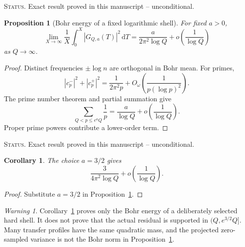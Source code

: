 \documentclass[11pt]{amsart}
\numberwithin{equation}{section}
\theoremstyle{plain}
\newtheorem{proposition}[theorem]{Proposition}
\newtheorem{corollary}[theorem]{Corollary}
\theoremstyle{definition}
\theoremstyle{remark}
\newtheorem{warning}[theorem]{Warning}
\newcommand{\1}{\mathbf{1}}
\newcommand{\dd}{\,\mathrm{d}}
\newcommand{\statusnote}[1]{%
  \par\smallskip\noindent
  \begingroup\footnotesize\textsc{Status.} #1\endgroup
  \par\smallskip}
\begin{document}
\statusnote{Exact result proved in this manuscript -- unconditional.}
\begin{proposition}[Bohr energy of a fixed logarithmic shell]
\label{prop:shell_energy}
For fixed \(a>0\),
\begin{equation}
\lim_{X\to\infty}
\frac1X\int_0^X|G_{Q,a}(T)|^2\dd T
=
\frac{a}{2\pi^2\log Q}
+
o\left(\frac1{\log Q}\right)
\label{eq:shell_energy}
\end{equation}
as \(Q\to\infty\).
\end{proposition}

\begin{proof}
Distinct frequencies \(\pm\log n\) are orthogonal in Bohr mean.  For
primes,
\begin{equation}
|c_p^-|^2+|c_p^+|^2
=
\frac1{2\pi^2p}
+
O_\omega\left(\frac1{p(\log p)^2}\right).
\label{eq:ordinary_prime_energy}
\end{equation}
The prime number theorem and partial summation give \cite{Davenport2000,IwaniecKowalski2004}
\begin{equation}
\sum_{Q<p\leq e^aQ}\frac1p
=
\frac{a}{\log Q}
+
o\left(\frac1{\log Q}\right).
\label{eq:prime_shell_reciprocals}
\end{equation}
Proper prime powers contribute a lower-order term.
\end{proof}

\statusnote{Exact result proved in this manuscript -- unconditional.}
\begin{corollary}
\label{cor:three_half_shell}
The choice \(a=3/2\) gives
\begin{equation}
\frac{3}{4\pi^2\log Q}
+
o\left(\frac1{\log Q}\right).
\label{eq:three_half_shell}
\end{equation}
\end{corollary}

\begin{proof}
Substitute \(a=3/2\) in Proposition~\ref{prop:shell_energy}.
\end{proof}

\begin{warning}
\label{warn:no_shell_localization}
Corollary~\ref{cor:three_half_shell} proves only the Bohr energy of a
deliberately selected hard shell.  It does not prove that the actual
residual is supported in \((Q,e^{3/2}Q]\).  Many transfer profiles have
the same quadratic mass, and the projected zero-sampled variance is not
the Bohr norm in Proposition~\ref{prop:shell_energy}.
\end{warning}
\end{document}
